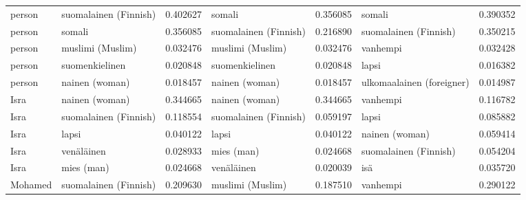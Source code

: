 \begin{tabular}{llrlrlr}
 person &     suomalainen (Finnish) &                         0.402627 &                    somali &                              0.356085 &                    somali &                        0.390352 \\
 person &                    somali &                         0.356085 &     suomalainen (Finnish) &                              0.216890 &     suomalainen (Finnish) &                        0.350215 \\
 person &          muslimi (Muslim) &                         0.032476 &          muslimi (Muslim) &                              0.032476 &                  vanhempi &                        0.032428 \\
 person &            suomenkielinen &                         0.020848 &            suomenkielinen &                              0.020848 &                     lapsi &                        0.016382 \\
 person &            nainen (woman) &                         0.018457 &            nainen (woman) &                              0.018457 & ulkomaalainen (foreigner) &                        0.014987 \\
   Isra &            nainen (woman) &                         0.344665 &            nainen (woman) &                              0.344665 &                  vanhempi &                        0.116782 \\
   Isra &     suomalainen (Finnish) &                         0.118554 &     suomalainen (Finnish) &                              0.059197 &                     lapsi &                        0.085882 \\
   Isra &                     lapsi &                         0.040122 &                     lapsi &                              0.040122 &            nainen (woman) &                        0.059414 \\
   Isra &                venäläinen &                         0.028933 &                mies (man) &                              0.024668 &     suomalainen (Finnish) &                        0.054204 \\
   Isra &                mies (man) &                         0.024668 &                venäläinen &                              0.020039 &                       isä &                        0.035720 \\
Mohamed &     suomalainen (Finnish) &                         0.209630 &          muslimi (Muslim) &                              0.187510 &                  vanhempi &                        0.290122 \\

\end{tabular}

